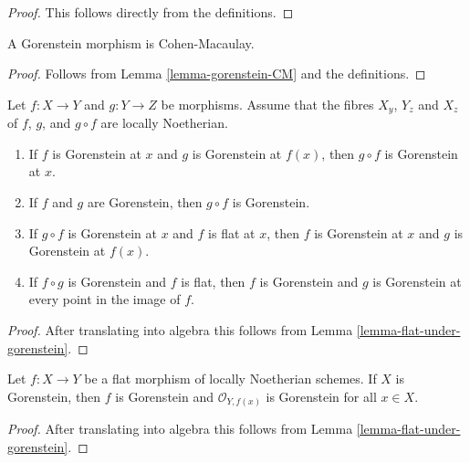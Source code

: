 \begin{proof}
This follows directly from the definitions.
\end{proof}

\begin{lemma}
\label{lemma-gorenstein-CM-morphism}
A Gorenstein morphism is Cohen-Macaulay.
\end{lemma}

\begin{proof}
Follows from Lemma \ref{lemma-gorenstein-CM} and the definitions.
\end{proof}

\begin{lemma}
\label{lemma-composition-gorenstein}
Let $f : X \to Y$ and $g : Y \to Z$ be morphisms. Assume that the
fibres $X_y$, $Y_z$ and $X_z$ of $f$, $g$, and $g \circ f$ are
locally Noetherian.
\begin{enumerate}
\item If $f$ is Gorenstein at $x$ and $g$ is Gorenstein
at $f(x)$, then $g \circ f$ is Gorenstein at $x$.
\item If $f$ and $g$ are Gorenstein, then $g \circ f$ is Gorenstein.
\item If $g \circ f$ is Gorenstein at $x$ and $f$ is flat at $x$,
then $f$ is Gorenstein at $x$ and $g$ is Gorenstein at $f(x)$.
\item If $f \circ g$ is Gorenstein and $f$ is flat, then
$f$ is Gorenstein and $g$ is Gorenstein at every point in
the image of $f$.
\end{enumerate}
\end{lemma}

\begin{proof}
After translating into algebra this follows from
Lemma \ref{lemma-flat-under-gorenstein}.
\end{proof}

\begin{lemma}
\label{lemma-flat-morphism-from-gorenstein-scheme}
Let $f : X \to Y$ be a flat morphism of locally Noetherian schemes.
If $X$ is Gorenstein, then $f$ is Gorenstein and $\mathcal{O}_{Y, f(x)}$
is Gorenstein for all $x \in X$.
\end{lemma}

\begin{proof}
After translating into algebra this follows from
Lemma \ref{lemma-flat-under-gorenstein}.
\end{proof}

